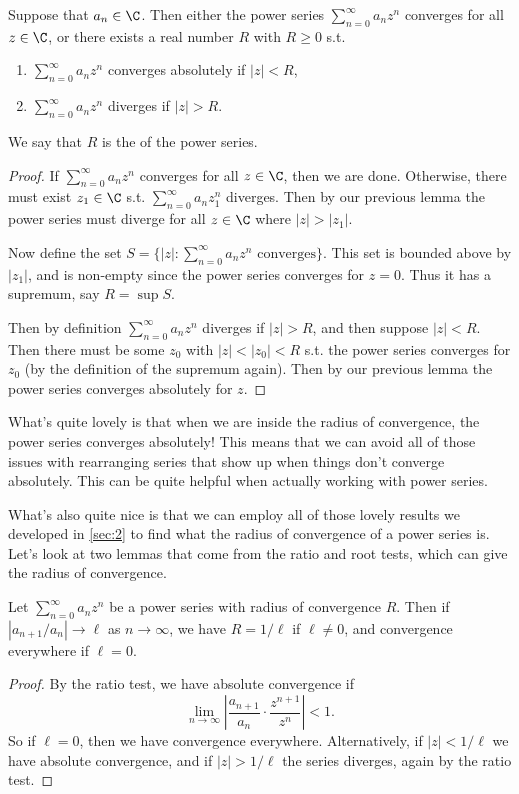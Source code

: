 \begin{theorem}
	Suppose that $a_n \in \C$. Then either the power series $\sum_{n = 0}^\infty a_n z^n$ converges for all $z \in \C$, or there exists a real number $R$ with $R \geq 0$ s.t.
	\begin{enumerate}[label=(\roman*)]
		\item $\sum_{n =0}^\infty a_n z^n$ converges absolutely if $|z| < R$,
		\item $\sum_{n =0}^\infty a_n z^n$ diverges if $|z| > R$.
	\end{enumerate}
	We say that $R$ is the  of the power series.
\end{theorem}
\begin{proof}
	If $\sum_{n = 0}^\infty a_n z^n$ converges for all $z \in \C$, then we are done. Otherwise, there must exist $z_1 \in \C$ s.t. $\sum_{n = 0}^{\infty} a_n z_1^n$ diverges. Then by our previous lemma the power series must diverge for all $z \in \C$ where $|z| > |z_1|$.

	Now define the set $S = \{|z| : \sum_{n = 0}^\infty a_n z^n \text{ converges}\}$. This set is bounded above by $|z_1|$, and is non-empty since the power series converges for $z = 0$. Thus it has a supremum, say $R = \sup S$. 

	Then by definition $\sum_{n = 0}^{\infty} a_n z^n$ diverges if $|z| > R$, and then suppose $|z| < R$. Then there must be some $z_0$ with $|z| < |z_0| < R$ s.t. the power series converges for $z_0$ (by the definition of the supremum again). Then by our previous lemma the power series converges absolutely for $z$.
\end{proof}

What's quite lovely is that when we are inside the radius of convergence, the power series converges absolutely! This means that we can avoid all of those issues with rearranging series that show up when things don't converge absolutely. This can be quite helpful when actually working with power series.

What's also quite nice is that we can employ all of those lovely results we developed in \autoref{sec:2} to find what the radius of convergence of a power series is.
Let's look at two lemmas that come from the ratio and root tests, which can give the radius of convergence. 

\begin{lemma}
	Let $\sum_{n = 0}^{\infty} a_n z^n$ be a power series with radius of convergence $R$.
	Then if $|a_{n + 1}/a_n| \rightarrow \ell$ as $n \rightarrow \infty$, we have $R = 1/\ell$ if $\ell \neq 0$, and convergence everywhere if $\ell = 0$.
\end{lemma}
\begin{proof}
	By the ratio test, we have absolute convergence if 
	$$
	\lim_{n \to \infty} \left|\frac{a_{n + 1}}{a_{n}} \cdot \frac{z^{n + 1}}{z^n}\right| < 1.
	$$
	So if $\ell = 0$, then we have convergence everywhere. Alternatively, if $|z| < 1/\ell$ we have absolute convergence, and if $|z| > 1/\ell$ the series diverges, again by the ratio test.
\end{proof}

